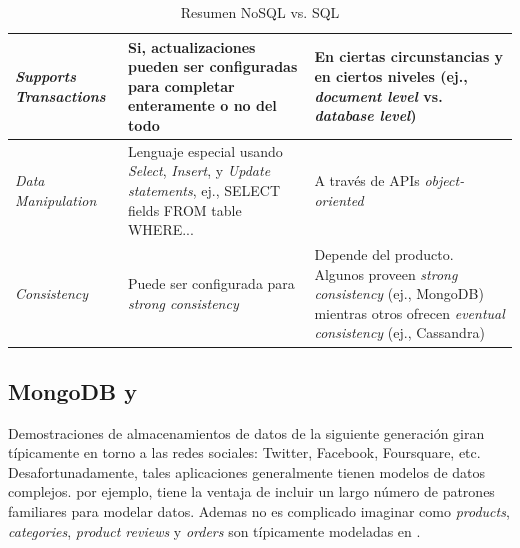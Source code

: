 \begin{table}[h!]
\begin{tabular}{ |L{0.1\paperwidth}|L{0.3\paperwidth}|L{0.3\paperwidth}|}
\\ \hline
	\textit{Supports Transactions}&
	
	Si, actualizaciones pueden ser configuradas para completar enteramente o no del todo&	
	
	En ciertas circunstancias y en ciertos niveles (ej., \textit{document level} vs. \textit{database level})
	
\\ \hline
	\textit{Data Manipulation}&
	
	Lenguaje especial usando \textit{Select}, \textit{Insert}, y \textit{Update statements}, ej., SELECT fields FROM table WHERE...&	
	
	A través de APIs \textit{object-oriented}

\\ \hline

	\textit{Consistency}&
	
	Puede ser configurada para \textit{strong consistency}&
	
	Depende del producto. Algunos proveen \textit{strong consistency} (ej., MongoDB) mientras otros ofrecen \textit{eventual consistency} (ej., Cassandra)

\\ \hline
\end{tabular}
    \caption{ Resumen NoSQL vs. SQL}
    \label{tab:SQL_vs_noSQL_summary}
\end{table}

\subsection{MongoDB y  \cite{online_mongodb_ecommerce}}
\label{cap:justificacion_proyecto:MongoDB_ECommerce}

Demostraciones de almacenamientos de datos de la siguiente generación giran típicamente en torno a las redes sociales: Twitter, Facebook, Foursquare, etc. Desafortunadamente, tales aplicaciones generalmente tienen modelos de datos complejos. \textit{} por ejemplo, tiene la ventaja de incluir un largo número de patrones familiares para modelar datos. Ademas no es complicado imaginar como \textit{products}, \textit{categories}, \textit{product reviews} y \textit{orders} son típicamente modeladas en .

